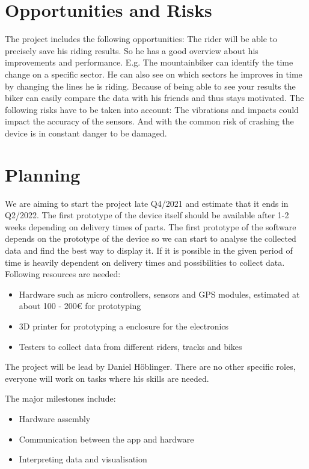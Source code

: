 \documentclass[12pt]{article}
\theoremstyle{definition}
\begin{document}
\pagebreak
\section{Opportunities and Risks}
The project includes the following opportunities: The rider will be able to precisely save his riding results. So he has a good overview about his improvements and performance. E.g. The mountainbiker can identify the time change on a specific sector. He can also see on which sectors he improves in time by changing the lines he is riding. Because of being able to see your results the biker can easily compare the data with his friends and thus stays motivated.
The following risks have to be taken into account: The vibrations and impacts could impact the accuracy of the sensors. And with the common risk of crashing the device is in constant danger to be damaged.

\pagebreak
\section{Planning}
We are aiming to start the project late Q4/2021 and estimate that it ends in Q2/2022. The first prototype of the device itself should be available after 1-2 weeks depending on delivery times of parts. The first prototype of the software depends on the prototype of the device so we can start to analyse the collected data and find the best way to display it. If it is possible in the given period of time is heavily dependent on delivery times and possibilities to collect data.
Following resources are needed: 
\begin{itemize}
\item Hardware such as micro controllers, sensors and GPS modules, estimated at about 100 - 200€ for prototyping
\item 3D printer for prototyping a enclosure for the electronics
\item Testers to collect data from different riders, tracks and bikes
\end{itemize}

The project will be lead by Daniel Höblinger. There are no other specific roles, everyone will work on tasks where his skills are needed.

The major milestones include:
\begin{itemize}
    \item Hardware assembly
    \item Communication between the app and hardware
    \item Interpreting data and visualisation
\end{itemize}
\end{document}
